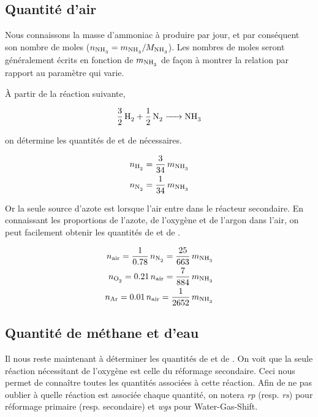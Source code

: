 \subsection{Quantité d'air}

Nous connaissons la masse d'ammoniac à produire par jour, 
et par conséquent son nombre de moles ($n_{\ce{NH3}} = m_{\ce{NH3}}/M_{\ce{NH3}}$).
Les nombres de moles seront généralement écrits en fonction de $m_{\ce{NH3}}$ 
de façon à montrer la relation par rapport au paramètre qui varie.

À partir de la réaction suivante,

\begin{equation*}
	\ce{\frac{3}{2} \, H2 + \frac{1}{2} \, N2 -> NH3} 
\end{equation*}

on détermine les quantités de  et de  nécessaires.

\begin{align}
	n_{\ce{H2}} = \frac{3}{34} \, m_{\ce{NH3}} 
	\label{eq:moles_H2} \\
	n_{\ce{N2}} = \frac{1}{34} \, m_{\ce{NH3}} \nonumber
\end{align}

Or la seule source d'azote est lorsque l'air entre dans le réacteur secondaire.
En connaissant les proportions de l'azote, de l'oxygène et de l'argon dans 
l'air, on peut facilement obtenir les quantités de  et de .

\begin{align*}
	n_{\text{air}} = \frac{1}{0.78} \, n_{\ce{N2}} = \frac{25}{663} \, m_{\ce{NH3}} \\
	n_{\ce{O2}} = 0.21 \, n_{\text{air}} = \frac{7}{884} \, m_{\ce{NH3}} \\
	n_{\ce{Ar}} = 0.01 \, n_{\text{air}} = \frac{1}{2652} \, m_{\ce{NH3}} 
\end{align*}

\subsection{Quantité de méthane et d'eau}

Il nous reste maintenant à déterminer les quantités de  et de .
On voit que la seule réaction nécessitant de l'oxygène est celle du 
réformage secondaire. Ceci nous permet de conna\^itre toutes les quantités 
associées à cette réaction. 
Afin de ne pas oublier à quelle réaction est associée chaque quantité, 
on notera \textit{rp} (resp. \textit{rs}) pour réformage primaire (resp. secondaire)
et \textit{wgs} pour Water-Gas-Shift.

